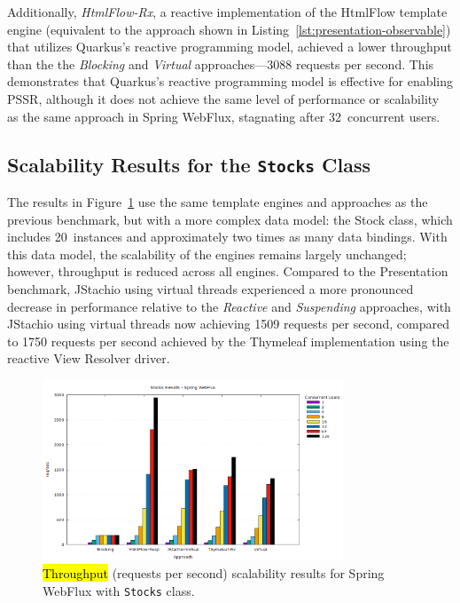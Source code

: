\documentclass[software,article,accept,pdftex,moreauthors]{Definitions/mdpi}
\begin{document}
Additionally, \textit{HtmlFlow-Rx}, a reactive implementation of the HtmlFlow
template engine (equivalent to the approach shown in
Listing~\ref{lst:presentation-observable}) that utilizes Quarkus's reactive
programming model, achieved a lower throughput than the the \textit{Blocking}
and \textit{Virtual} approaches---3088 requests per second. This demonstrates
that Quarkus's reactive programming model is effective for enabling PSSR\@,
although it does not achieve the same level of performance or scalability as
the same approach in Spring WebFlux, stagnating after 32~concurrent users.

\subsection{Scalability Results for the \texttt{Stocks} Class} \label{sec:stocks-results}



The results in Figure~\ref{fig:stocks-webflux-jmeter} use the same template
engines and approaches as the previous benchmark, but with a more complex data
model: the Stock class, which includes 20~instances and approximately two times
as many data bindings. With this data model, the scalability of the engines
remains largely unchanged; however, throughput is reduced across all engines.
Compared to the Presentation benchmark, JStachio using virtual threads
experienced a more pronounced decrease in performance relative to the
\textit{Reactive} and \textit{Suspending} approaches, with JStachio using
virtual threads now achieving 1509 requests per second, compared to 1750
requests per second achieved by the Thymeleaf implementation using the reactive
View Resolver driver.

\begin{figure}[H]
\vspace{-6pt}
     \includegraphics[width=0.8\textwidth]{./Graphs/stocks-webflux-jmeter.png}
     \caption{\hl{Throughput} %
 (requests per second) scalability results for Spring WebFlux with \texttt{Stocks} class.}\label{fig:stocks-webflux-jmeter}
\end{figure}
\end{document}
